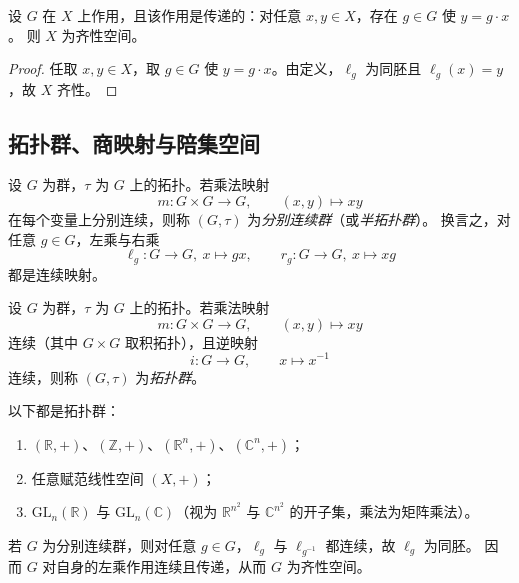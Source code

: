 \documentclass[lang=cn,a4paper,newtx,figureplace=section,tableplace=section]{elegantbook}
\begin{document}
\begin{proposition}\label{prop:transitive-action-homogeneous}
  设 $G$ 在 $X$ 上作用，且该作用是传递的：对任意 $x,y\in X$，存在 $g\in G$ 使 $y=g\cdot x$。
  则 $X$ 为齐性空间。
\end{proposition}
\begin{proof}
  任取 $x,y\in X$，取 $g\in G$ 使 $y=g\cdot x$。由定义，$\ell_g$ 为同胚且 $\ell_g(x)=y$，故 $X$ 齐性。
\end{proof}

\subsection{拓扑群、商映射与陪集空间}

\begin{definition}[分别连续群]\label{def:semitopological-group}
  设 $G$ 为群，$\tau$ 为 $G$ 上的拓扑。若乘法映射
  \[
    m:G\times G\to G,\qquad (x,y)\mapsto xy
  \]
  在每个变量上分别连续，则称 $(G,\tau)$ 为\emph{分别连续群}（或\emph{半拓扑群}）。
  换言之，对任意 $g\in G$，左乘与右乘
  \[
    \ell_g:G\to G,\ x\mapsto gx,\qquad r_g:G\to G,\ x\mapsto xg
  \]
  都是连续映射。
\end{definition}

\begin{definition}[拓扑群]\label{def:topological-group}
  设 $G$ 为群，$\tau$ 为 $G$ 上的拓扑。若乘法映射
  \[
    m:G\times G\to G,\qquad (x,y)\mapsto xy
  \]
  连续（其中 $G\times G$ 取积拓扑），且逆映射
  \[
    i:G\to G,\qquad x\mapsto x^{-1}
  \]
  连续，则称 $(G,\tau)$ 为\emph{拓扑群}。
\end{definition}

\begin{example}\label{ex:topological-group-examples}
  以下都是拓扑群：
  \begin{enumerate}[(1)]
    \item $(\mathbb R,+)$、$(\mathbb Z,+)$、$(\mathbb R^n,+)$、$(\mathbb C^n,+)$；
    \item 任意赋范线性空间 $(X,+)$；
    \item $\mathrm{GL}_n(\mathbb R)$ 与 $\mathrm{GL}_n(\mathbb C)$（视为 $\mathbb R^{n^2}$ 与 $\mathbb C^{n^2}$ 的开子集，乘法为矩阵乘法）。
  \end{enumerate}
\end{example}

\begin{example}\label{ex:semitopological-group-homogeneous}
  若 $G$ 为分别连续群，则对任意 $g\in G$，$\ell_g$ 与 $\ell_{g^{-1}}$ 都连续，故 $\ell_g$ 为同胚。
  因而 $G$ 对自身的左乘作用连续且传递，从而 $G$ 为齐性空间。
\end{example}
\end{document}
